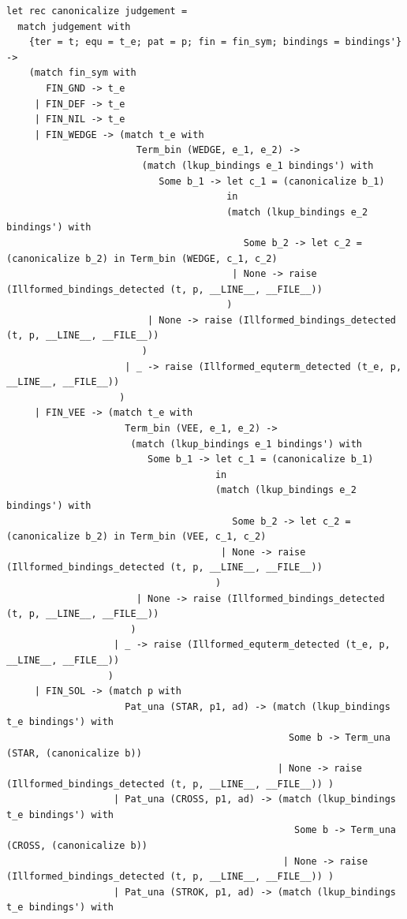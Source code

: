 \documentclass[12pt]{article}
\begin{document}
\begin{tiny}
\begin{verbatim}
let rec canonicalize judgement = 
  match judgement with
    {ter = t; equ = t_e; pat = p; fin = fin_sym; bindings = bindings'} ->
    (match fin_sym with
       FIN_GND -> t_e
     | FIN_DEF -> t_e
     | FIN_NIL -> t_e
     | FIN_WEDGE -> (match t_e with
                       Term_bin (WEDGE, e_1, e_2) ->
                        (match (lkup_bindings e_1 bindings') with
                           Some b_1 -> let c_1 = (canonicalize b_1)
                                       in
                                       (match (lkup_bindings e_2 bindings') with
                                          Some b_2 -> let c_2 = (canonicalize b_2) in Term_bin (WEDGE, c_1, c_2)
                                        | None -> raise (Illformed_bindings_detected (t, p, __LINE__, __FILE__))
                                       )
                         | None -> raise (Illformed_bindings_detected (t, p, __LINE__, __FILE__))
                        )
                     | _ -> raise (Illformed_equterm_detected (t_e, p, __LINE__, __FILE__))
                    )
     | FIN_VEE -> (match t_e with
                     Term_bin (VEE, e_1, e_2) ->
                      (match (lkup_bindings e_1 bindings') with
                         Some b_1 -> let c_1 = (canonicalize b_1)
                                     in
                                     (match (lkup_bindings e_2 bindings') with
                                        Some b_2 -> let c_2 = (canonicalize b_2) in Term_bin (VEE, c_1, c_2)
                                      | None -> raise (Illformed_bindings_detected (t, p, __LINE__, __FILE__))
                                     )
                       | None -> raise (Illformed_bindings_detected (t, p, __LINE__, __FILE__))
                      )
                   | _ -> raise (Illformed_equterm_detected (t_e, p, __LINE__, __FILE__))
                  )
     | FIN_SOL -> (match p with
                     Pat_una (STAR, p1, ad) -> (match (lkup_bindings t_e bindings') with
                                                  Some b -> Term_una (STAR, (canonicalize b))
                                                | None -> raise (Illformed_bindings_detected (t, p, __LINE__, __FILE__)) )
                   | Pat_una (CROSS, p1, ad) -> (match (lkup_bindings t_e bindings') with
                                                   Some b -> Term_una (CROSS, (canonicalize b))
                                                 | None -> raise (Illformed_bindings_detected (t, p, __LINE__, __FILE__)) )
                   | Pat_una (STROK, p1, ad) -> (match (lkup_bindings t_e bindings') with

\end{verbatim}
\end{tiny}
\end{document}
